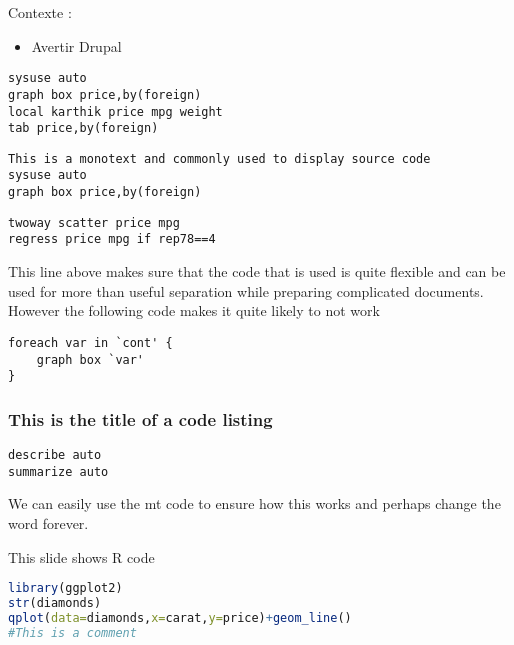\documentclass[color=usenames,dvipsnames]{beamer}
\begin{document}
\begin{frame}[fragile]
\begin{large}
    Contexte : \newline \pause
\end{large}

\begin{itemize}
    \item Avertir Drupal
\end{itemize}
\begin{lstlisting}
sysuse auto
graph box price,by(foreign)
local karthik price mpg weight
tab price,by(foreign)
\end{lstlisting}
\end{frame}
\begin{frame}
	\texttt{This is a monotext and commonly used to display source code\\
		    sysuse auto \\
		    graph box price,by(foreign)}
\end{frame}
\begin{frame}[fragile]
\begin{lstlisting}
twoway scatter price mpg
regress price mpg if rep78==4
\end{lstlisting} 
This line above makes sure that the code that is used is quite flexible and can be used for more than useful separation while preparing complicated documents. However the following code makes it quite likely to not work
\begin{lstlisting}
foreach var in `cont' {
    graph box `var'
}
\end{lstlisting}
\end{frame}
\begin{frame}[fragile] 
	\frametitle{This is the title of a code listing}
\begin{lstlisting}[frame=shadowbox, rulesepcolor=\color{gray}]
describe auto
summarize auto		
\end{lstlisting}
\bigskip
We can easily use the mt code to ensure how this works and perhaps change the word forever.
\end{frame}
\begin{frame}[fragile] {This slide shows R code}
\begin{lstlisting}[language=R,frame=shadowbox,rulesepcolor=\color{gray}]
library(ggplot2)
str(diamonds)
qplot(data=diamonds,x=carat,y=price)+geom_line()
#This is a comment		
\end{lstlisting}
\end{frame}
\end{document}
